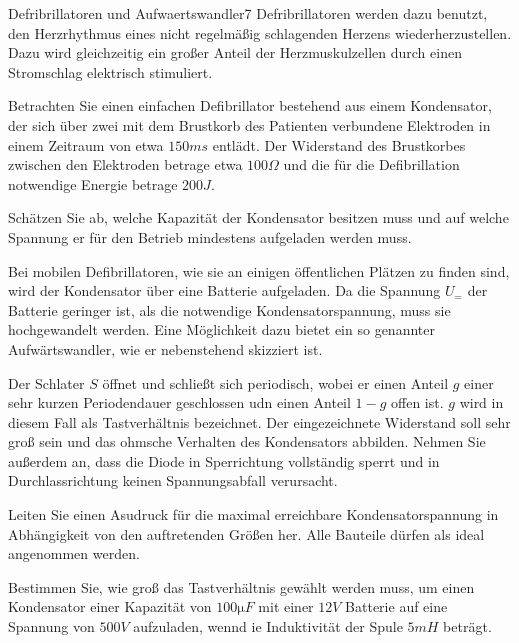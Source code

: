 \begin{problem}{Defribrillatoren und Aufwaertswandler}{7}
 Defribrillatoren werden dazu benutzt, den Herzrhythmus eines nicht regelmäßig schlagenden Herzens wiederherzustellen.  Dazu wird gleichzeitig ein großer Anteil der Herzmuskulzellen durch einen Stromschlag elektrisch stimuliert.

Betrachten Sie einen einfachen Defibrillator bestehend aus einem Kondensator, der sich über zwei mit dem Brustkorb des Patienten verbundene Elektroden in einem Zeitraum von etwa $150\unit{ms}$ entlädt.  Der Widerstand des Brustkorbes zwischen den Elektroden betrage etwa $100\unit{\Omega}$ und die für die Defibrillation notwendige Energie betrage $200\unit{J}$.

\begin{abcenum}
\item Schätzen Sie ab, welche Kapazität der Kondensator besitzen muss und auf welche Spannung er für den Betrieb mindestens aufgeladen werden muss.
\end{abcenum}

Bei mobilen Defibrillatoren, wie sie an einigen öffentlichen Plätzen zu finden sind, wird der Kondensator über eine Batterie aufgeladen.  Da die Spannung $U_=$ der Batterie geringer ist, als die notwendige Kondensatorspannung, muss sie hochgewandelt werden.  Eine Möglichkeit dazu bietet ein so genannter Aufwärtswandler, wie er nebenstehend skizziert ist.

Der Schlater $S$ öffnet und schließt sich periodisch, wobei er einen Anteil $g$ einer sehr kurzen Periodendauer geschlossen udn einen Anteil $1-g$ offen ist.  $g$ wird in diesem Fall als Tastverhältnis bezeichnet.  Der eingezeichnete Widerstand soll sehr groß sein und das ohmsche Verhalten des Kondensators abbilden.  Nehmen Sie außerdem an, dass die Diode in Sperrichtung vollständig sperrt und in Durchlassrichtung keinen Spannungsabfall verursacht.

\begin{abcenum}
  \item Leiten Sie einen Asudruck für die maximal erreichbare Kondensatorspannung in Abhängigkeit von den auftretenden Größen her.  Alle Bauteile dürfen als ideal angenommen werden.
\item Bestimmen Sie, wie groß das Tastverhältnis gewählt werden muss, um einen Kondensator einer Kapazität von $100\unit{\micro F}$ mit einer $12\unit{V}$ Batterie auf eine Spannung von $500\unit{V}$ aufzuladen, wennd ie Induktivität der Spule $5\unit{mH}$ beträgt.
\end{abcenum}

\end{problem}

